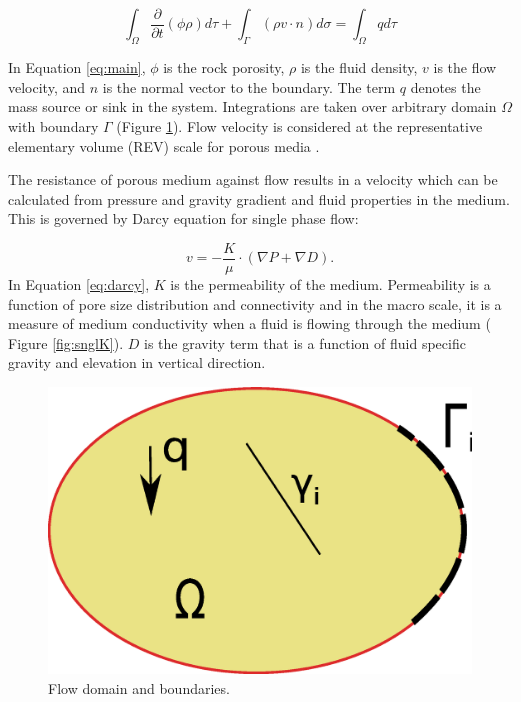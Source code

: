 \begin{equation}
  \int_{\Omega}\frac{\partial}{\partial t}(\phi\rho)d\tau+\int_{\Gamma}(\rho v
\cdot n)d\sigma=\int_{\Omega}qd\tau
  \label{eq:main}
\end{equation}

In Equation \ref{eq:main}, $\phi$ is the rock porosity, $\rho$ is the fluid
density, $v$ is the flow velocity, and $n$ is the normal vector to the boundary.
The term $q$ denotes the mass source or sink in the system. Integrations are
taken over arbitrary domain $\Omega$ with boundary $\Gamma$ (Figure
\ref{fig:prsDmn}). Flow velocity is considered at the representative elementary
volume (REV) scale for porous media \cite{bear1988dynamics}.

The resistance of porous medium against flow results in a velocity which can be
calculated from pressure and gravity gradient and fluid properties in the
medium.
This is governed by Darcy equation for single phase flow:
 
\begin{equation}
  v=-\frac{K}{\mu}\cdot (\nabla{P}+\nabla{D}).
  \label{eq:darcy}
\end{equation} In Equation \ref{eq:darcy}, $K$ is the permeability of the
medium.
Permeability is a function of pore size distribution and connectivity and in the
macro scale, it is a measure of medium conductivity when a fluid is flowing
through the medium ( Figure \ref{fig:snglK}). $D$ is the gravity term that is a
function of fluid specific gravity and elevation in vertical direction. 

\begin{figure}[thb] 
  \centering{}
  \includegraphics[scale=0.3]{./figurer/BCPB.eps}
  \caption{Flow domain and boundaries.}
  \label{fig:prsDmn}
\end{figure}

